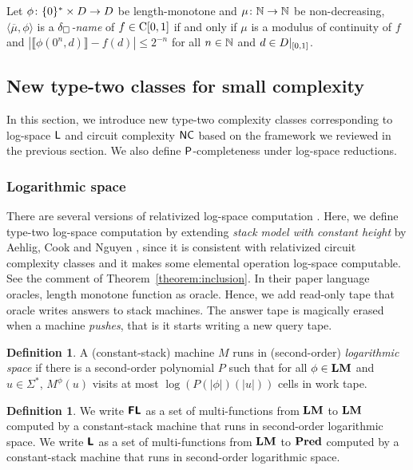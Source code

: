 \documentclass{article}
\theoremstyle{definition}
\newtheorem{definition}[theorem]{Definition}
\theoremstyle{remark}
\begin{document}
Let $\phi \colon \{0\}^* \times D \to D$ be length-monotone and $\mu \colon \mathbb N \to \mathbb N$ be non-decreasing,
$\langle \overline{\mu}, \phi \rangle$ is a {\em $\delta _\square$-name} of $f \in \mathrm C[0,1]$
if and only if $\mu$ is a modulus of continuity of $f$
and $|\llbracket \phi(0^n, d) \rrbracket - f(d)| \le 2^{-n}$ for all $n \in \mathbb N$ and $d \in D|_{[0,1]}$.




\subsection{New type-two classes for small complexity}
\label{section:small-classes}

In this section, we introduce new type-two complexity classes
corresponding to log-space $\mathsf{L}$ and circuit complexity $\mathsf{NC}$
based on the framework we reviewed in the previous section.
We also define $\mathsf{P}$-completeness under log-space reductions.

\subsubsection{Logarithmic space}
There are several versions of relativized log-space computation
\cite{aehlig2007relativizing,buss1988relativized,ladner1976relativization,wilson1988measure, ota2013logspace}.
Here, we define type-two log-space computation 
by extending \emph{stack model with constant height} by Aehlig, Cook and Nguyen 
\cite{aehlig2007relativizing},
since it is consistent with relativized circuit complexity classes 
and it makes some elemental operation log-space computable.
See the comment of Theorem~\ref{theorem:inclusion}.
In their paper language oracles,
 length monotone function as oracle.
Hence, we add read-only tape that oracle writes answers to stack machines.
The answer tape is magically erased when a machine \emph{pushes},
that is it starts writing a new query tape.

\begin{definition}
 A (constant-stack) machine $M$ runs in (second-order) \emph{logarithmic space}
 if there is a second-order polynomial $P$ such that for all $\phi \in \mathbf{LM}$
 and $u \in \Sigma^*$, $M^\phi(u)$ visits at most $\log(P(|\phi|)(|u|))$ cells
 in work tape.
\end{definition}

\begin{definition}
 We write $\text{\bfseries \sffamily \upshape FL}$ as a set of multi-functions from $\mathbf{LM}$ to $\mathbf{LM}$
 computed by a constant-stack machine that runs in second-order logarithmic space.
 We write $\text{\bfseries \sffamily \upshape L}$ as a set of multi-functions from $\mathbf{LM}$ to $\mathbf{Pred}$
 computed by a constant-stack machine that runs in second-order logarithmic space.
\end{definition}
\end{document}
